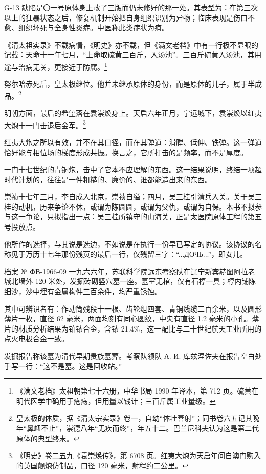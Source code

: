 G-13 缺陷是〇一号原体身上改了三版而仍未修好的那一处。其表型为：在第三次以上的狂暴状态之后，修复机制开始把自身组织识别为异物；临床表现是伤口不愈、组织坏死与全身性炎症。中医称此类症状为疽。

《清太祖实录》不载病情，《明史》亦不载，但《满文老档》中有一行极不显眼的记载：天命十一年七月，“上命取硫黄三百斤，入汤池”。三百斤硫黄入汤池，其用途与治病无关，更接近于防腐。\footnote{《满文老档》太祖朝第七十六册，中华书局 1990 年译本，第 712 页。硫黄在明代医学中确用于疮疡，但用量以钱计；三百斤属工业量级。}

努尔哈赤死后，皇太极继位。他并未继承原体的身份，而是原体的儿子，属于半成品。\footnote{皇太极的体质，据《清太宗实录》卷一，自幼“体壮善射”；同书卷六五记其晚年“鼻衄不止”，崇德八年“无疾而终”，年五十二。巴兰尼科夫认为这是第二代原体的典型终末。}

明朝方面，最后的希望落在袁崇焕身上。天启六年正月，宁远城下，袁崇焕以红夷大炮十一门击退后金军。\footnote{《明史》卷二五九《袁崇焕传》，第 6708 页。红夷大炮为天启年间自澳门购入的英国舰炮仿制品，口径 120 毫米，射程约二公里。}

红夷大炮之所以有效，并不在其口径，而在其弹道：滑膛、低伸、铁弹。这一弹道恰好能与相位场的梯度形成共振。换言之，它所打击的是频率，而不是厚度\nobreak。

一门十七世纪的青铜炮，击中了它本不应理解的东西。这一结果说明，终结一项超时代计划的，往往是一件粗糙的、廉价的、谁都能造出来的东西。

崇祯十七年三月，李自成入北京，崇祯自缢；四月，吴三桂引清兵入关。关于吴三桂的动机，历来争论不休，或谓为陈圆圆，或谓为父仇，或谓为自保。本书不拟参与这一争论，只拟指出一点：吴三桂所镇守的山海关，正是太医院原体工程的第五号投放点。

他所作的选择，与其说是选边，不如说是在执行一份早已写定的协议。该协议的名称见于万历十七年那份残页的最后一行，仅残留三字：“...ДОЧЬ...”，即女儿\nobreak。

\begin{archive}{档案 № ФВ-1966-09}
一九六六年，苏联科学院远东考察队在辽宁新宾赫图阿拉老城北墙外 120 米处，发掘砖砌竖穴墓一座。墓室无棺，仅有石椁一具；椁内铺陈细沙，沙中埋有金属构件三百余件，均严重锈蚀。

其中可辨识者有：作动筒残段十一根、齿轮组四套、青铜线缆二百余米，以及圆形薄片一枚，直径 62 毫米，两面均刻有同心圆纹，中央有直径 1.2 毫米的小孔。薄片的材质分析结果为铂铱合金，含铱 21.4\%，这一配比与二十世纪航天工业所用的点火电极合金一致。

发掘报告称该墓为清代早期贵族墓葬。考察队领队 А. И. 库兹涅佐夫在报告空白处手写一行：“这不是墓。这是回收站。”
\end{archive}

